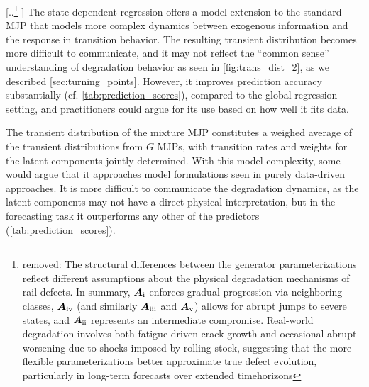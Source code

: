 \documentclass{article}
\newcommand{\RN}[1]{\textup{\uppercase\expandafter{\romannumeral#1}}}
\providecommand{\DIFadd}[1]{{\protect\color{blue} \sf #1}} %
\providecommand{\DIFdel}[1]{{\protect\color{red} [..\footnote{removed: #1} ]}} %
\providecommand{\DIFaddbegin}{} %
\providecommand{\DIFaddend}{} %
\providecommand{\DIFdelbegin}{} %
\providecommand{\DIFdelend}{} %
\begin{document}
\DIFdelbegin \DIFdel{The structural differences between the generator parameterizations reflect different assumptions about the physical degradation mechanisms of rail defects. %
In summary, $\bm{A}_{\RN{1}}$ enforces gradual progression via neighboring classes, $\bm{A}_{\RN{4}}$ (and similarly $\bm{A}_{\RN{3}}$ and $\bm{A}_{\RN{5}}$) allows for abrupt jumps to severe states, and $\bm{A}_{\RN{2}}$ represents an intermediate compromise. Real-world degradation involves both fatigue-driven crack growth and occasional abrupt worsening due to shocks imposed by rolling stock, suggesting that the more flexible parameterizations better approximate true defect evolution,  particularly in long-term forecasts over extended timehorizons}\DIFdelend \DIFaddbegin \DIFadd{The state-dependent regression offers a model extension to the standard MJP that models more complex dynamics between exogenous information and the response in transition behavior. The resulting transient distribution becomes more difficult to communicate, and it may not reflect the ``common sense'' understanding of degradation behavior as seen in \cref{fig:trans_dist_2}, as we described \cref{sec:turning_points}. However, it improves prediction accuracy substantially (cf. \cref{tab:prediction_scores}), compared to the global regression setting, and practitioners could argue for its use based on how well it fits data.
}

\DIFadd{The transient distribution of the mixture MJP constitutes a weighed average of the transient distributions from $G$ MJPs, with transition rates and weights for the latent components jointly determined. With this model complexity, some would argue that it approaches model formulations seen in purely data-driven approaches. It is more difficult to communicate the degradation dynamics, as the latent components may not have a direct physical interpretation, but in the forecasting task it outperforms any other of the predictors (\cref{tab:prediction_scores})}\DIFaddend .
\end{document}
